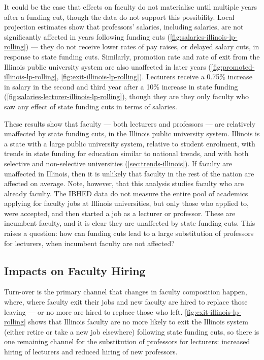 It could be the case that effects on faculty do not materialise until multiple years after a funding cut, though the data do not support this possibility.
Local projection estimates show that professors' salaries, including salaries, are not significantly affected in years following funding cuts (\autoref{fig:salaries-illinois-lp-rolling}) --- they do not receive lower rates of pay raises, or delayed salary cuts, in response to state funding cuts.
Similarly, promotion rate and rate of exit from the Illinois public university system are also unaffected in later years (\autoref{fig:promoted-illinois-lp-rolling}, \ref{fig:exit-illinois-lp-rolling}).
Lecturers receive a 0.75\% increase in salary in the second and third year after a 10\% increase in state funding (\autoref{fig:salaries-lecturer-illinois-lp-rolling}), though they are they only faculty who saw any effect of state funding cuts in terms of salaries.

These results show that faculty --- both lecturers and professors --- are relatively unaffected by state funding cuts, in the Illinois public university system.
Illinois is a state with a large public university system, relative to student enrolment, with trends in state funding for education similar to national trends, and with both selective and non-selective universities (\autoref{sec:trends-illinois}).
If faculty are unaffected in Illinois, then it is unlikely that faculty in the rest of the nation are affected on average.
Note, however, that this analysis studies faculty who are already faculty.
The IBHED data do not measure the entire pool of academics applying for faculty jobs at Illinois universities, but only those who applied to, were accepted, and then started a job as a lecturer or professor.
These are incumbent faculty, and it is clear they are unaffected by state funding cuts.
This raises a question: how can funding cuts lead to a large substitution of professors for lecturers, when incumbent faculty are not affected?

\subsection{Impacts on Faculty Hiring}
Turn-over is the primary channel that changes in faculty composition happen, where, where faculty exit their jobs and new faculty are hired to replace those leaving --- or no more are hired to replace those who left.
\autoref{fig:exit-illinois-lp-rolling} shows that Illinois faculty are no more likely to exit the Illinois system (either retire or take a new job elsewhere) following state funding cuts, so there is one remaining channel for the substitution of professors for lecturers: increased hiring of lecturers and reduced hiring of new professors.

